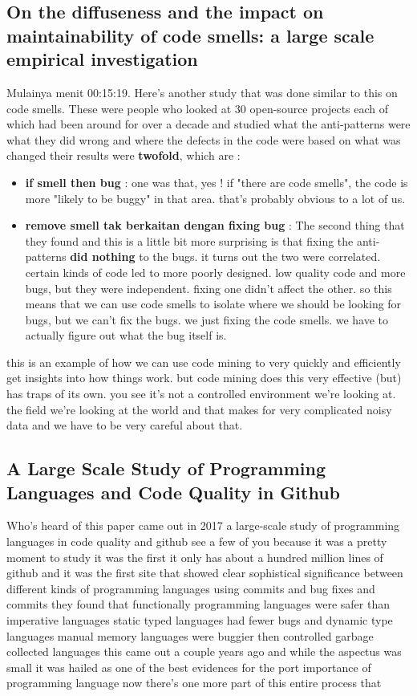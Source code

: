 \documentclass[14pt]{extreport}
\begin{document}
\subsection{On the diffuseness and the impact on maintainability of code smells: a large scale empirical investigation}
Mulainya menit 00:15:19.
Here's another study that was done similar to this on code smells.
These were people who looked at 30 open-source projects each of which had been around for over a decade and studied what the anti-patterns were what they did wrong and where the defects in the code were based on what was changed their results were \textbf{twofold}, which are : 
\begin{itemize}
	\item \textbf{if smell then bug} : one was that, yes ! if "there are code smells", the code is more "likely to be buggy" in that area. that's probably obvious to a lot of us. 
	\item \textbf{remove smell tak berkaitan dengan fixing bug} : The second thing that they found and this is a little bit more surprising is that fixing the anti-patterns \textbf{did nothing} to the bugs. 
	it turns out the two were correlated. 
	certain kinds of code led to more poorly designed. 
	low quality code and more bugs, but they were independent. 
	fixing one didn't affect the other. 
	so this means that we can use code smells to isolate where we should be looking for bugs, but we can't fix the bugs. 
	we just fixing the code smells.
	we have to actually figure out what the bug itself is.

\end{itemize}

this is an example of how we can use code mining to very quickly and efficiently get insights into how things work.
but code mining does this very effective (but) has traps of its own. 
you see it's not a controlled environment we're looking at. the field we're looking at the world and that makes for very complicated noisy data and we have to be very careful about that.

\subsection{A Large Scale Study of Programming Languages and Code Quality in Github}
Who's heard of this paper came out in 2017 a large-scale study of programming languages in code quality and github see a few of you because it was a pretty moment to study it was the first it only has about a hundred million lines of github and it was the first site that showed clear sophistical significance between different kinds of programming languages using commits and bug fixes and commits they found that functionally programming languages were safer than imperative languages static typed languages had fewer bugs and dynamic type languages manual memory languages were buggier then controlled garbage collected languages this came out a couple years ago and while the aspectus was small it was hailed as one of the best evidences for the port importance of programming language now there's one more part of this entire process that 
\end{document}
